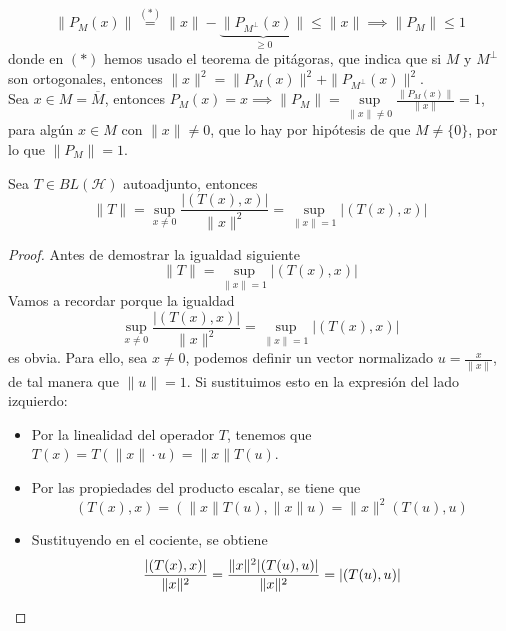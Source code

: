 \begin{ejercicio}
\begin{description}
\begin{equation*}
            \|P_M(x)\| \overset{(*)}{=} \|x\| - \underbrace{\|P_{M^\perp}(x)\|}_{\ge 0} \le \|x\| \implies \|P_M\| \le 1
        \end{equation*}
        donde en $(*)$ hemos usado el teorema de pitágoras, que indica que si $M$ y $M^\perp$ son ortogonales, entonces $\|x\|^2 = \|P_M(x)\|^2 + \|P_{M^\perp}(x)\|^2$. \\
        \noindent
        Sea $x \in M = \overline{M}$, entonces $P_M(x) = x \implies \|P_M\| = \sup\limits_{\|x\|\neq 0} \frac{\|P_M(x)\|}{\|x\|} =1$, para algún $x \in M$ con $\|x\|\neq 0$, que lo hay por hipótesis de que $M \neq \{0\}$, por lo que $\|P_M\| = 1$.
    \end{description}
\end{ejercicio}

\begin{teo}
    Sea $T \in BL(\mathcal{H})$ autoadjunto, entonces 
    \begin{equation*}
        \|T\| = \sup_{x \neq 0} \frac{|(T(x), x)|}{\|x\|^2} = \sup_{\|x\|=1} |(T(x), x)|
    \end{equation*}
\begin{proof}
    Antes de demostrar la igualdad siguiente
    \begin{equation*}
        \|T\|  = \sup_{\|x\|=1} |(T(x), x)|
    \end{equation*}
    Vamos a recordar porque la igualdad 
    $$\sup\limits_{x \neq 0} \dfrac{|(T(x), x)|}{\|x\|^2} = \sup\limits_{\|x\|=1} |(T(x), x)|$$ 
    es obvia. Para ello, sea $x \neq 0$, podemos definir un vector normalizado $u = \frac{x}{\|x\|}$, de tal manera que $\|u\| = 1$. Si sustituimos esto en la expresión del lado izquierdo:  
    \begin{itemize}
        \item Por la linealidad del operador $T$, tenemos que $T(x) = T(\|x\| \cdot u) = \|x\| T(u)$.
        \item Por las propiedades del producto escalar, se tiene que
        \begin{equation*}
            (T(x), x) = (\|x\| T(u), \|x\| u) = \|x\|^2 (T(u), u)
        \end{equation*}
        \item Sustituyendo en el cociente, se obtiene
        \begin{equation*}            
            \frac{|(T(x), x)|}{\|x\|^2} = \frac{\|x\|^2 |(T(u), u)|}{\|x\|^2} = |(T(u), u)| \\
        \end{equation*}
    \end{itemize}


\end{proof}
\end{teo}
